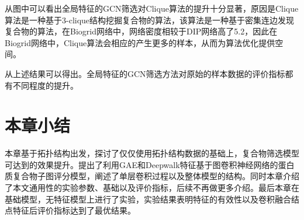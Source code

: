 从图中可以看出全局特征的GCN筛选对Clique算法的提升十分显著，原因是Clique算法是一种基于3-clique结构挖掘复合物的算法，该算法是一种基于密集连边发现复合物的算法，在Biogrid网络中，网络密度相较于DIP网络高了5.2，因此在Biogrid网络中，Clique算法会相应的产生更多的样本，从而为算法优化提供空间。

从上述结果可以得出。全局特征的GCN筛选方法对原始的样本数据的评价指标都有不同程度的提升。

\section{本章小结}
\label{section:NodeConv:summary}

本章基于拓扑结构出发，探讨了仅仅使用拓扑结构数据的基础上，复合物筛选模型可达到的效果提升。提出了利用GAE和Deepwalk特征基于图卷积神经网络的蛋白质复合物子图评分模型，阐述了单层卷积过程以及整体模型的结构。同时本章介绍了本文通用性的实验参数、基础以及评价指标，后续不再做更多介绍。最后本章在基础模型，无特征模型上进行了实验，实验结果表明特征的有效性以及卷积融合结点特征后评价指标达到了最优结果。
